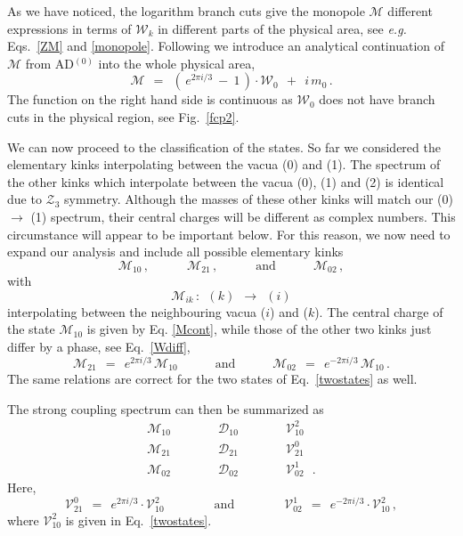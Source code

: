 \documentclass[epsfig,12pt]{article}
\def\beq{\begin{equation}}
\def\eeq{\end{equation}}
\def\beq{\begin{equation}}
\def\eeq{\end{equation}}
\newcommand{\mc}[1]{\mathcal{#1}}
\newcommand{\W}{\mathcal{W}}
\newcommand{\M}{\mathcal{M}}
\newcommand{\D}{\mathcal{D}}
\newcommand{\V}{\mathcal{V}}
\begin{document}
	As we have noticed, the logarithm branch cuts give the monopole $ \M $ different expressions in terms
	of $ \W_k $ in different parts of the physical area, see {\it e.g.} Eqs.~\eqref{ZM} and \eqref{monopole}.
	Following \cite{Bolokhov:2011mp} we introduce an analytical continuation of $ \M $ from AD$^{(0)}$ into
	the whole physical area,
\beq
\label{Mcont}
	\M  ~~=~~  \left(\, e^{2 \pi i / 3} ~-~ 1 \,\right) \cdot \W_0  ~~+~~  i\, m_0\,.
\eeq
	The function on the right hand side is continuous as $ \W_0 $ does not have branch cuts in the physical 
	region, see Fig.~\ref{fcp2}.

	We can now proceed to the classification of the states.
	So far we considered the elementary kinks interpolating between
	the vacua ({\sc \small 0}) and ({\sc \small 1}).
	The spectrum of the other kinks which interpolate between the vacua ({\sc \small 0}), ({\sc \small 1}) and ({\sc \small 2})
	is identical due to $ \mc{Z}_3 $ symmetry.
	Although the masses of these other kinks will match our ({\sc \small 0}) $ \rightarrow $ ({\sc \small 1}) spectrum, 
	their central charges will be different as complex numbers.
	This circumstance will appear to be important below.
	For this reason, we now need to expand our analysis and include all possible elementary kinks
\beq
	\M_{10}\,,   \qquad\quad     \M_{21}\,,     \qquad\quad\text{and}\qquad\quad   \M_{02}\,,
\eeq
	with
\beq
	\M_{ik} \,:  ~~  ({ \scriptstyle k }) ~~\longrightarrow~~ ({ \scriptstyle i })
\eeq
	interpolating between the neighbouring vacua ($ \scriptstyle i $) and ($ \scriptstyle k $).
	The central charge of the state $ \M_{10} $ is given by Eq. \eqref{Mcont}, while those
	of the other two kinks just differ by a phase, see Eq.~\eqref{Wdiff},
\beq
	\M_{21} ~~=~~ e^{2 \pi i / 3}\, \M_{10}  
	\qquad\quad \text{and} \qquad\quad 
	\M_{02} ~~=~~ e^{- 2 \pi i / 3}\, \M_{10}\,.
\eeq
	The same relations are correct for the two states of Eq.~\eqref{twostates} as well.

	The strong coupling spectrum can then be summarized as
\beq
\label{sspectrum}
	\begin{array}{ccc}
		\M_{10} \qquad\quad    &    \D_{10} \qquad\quad    &    \V_{10}^2    \phantom{~~~.}    \\[2mm]
		\M_{21} \qquad\quad    &    \D_{21} \qquad\quad    &    \V_{21}^0    \phantom{~~~.}    \\[2mm]
		\M_{02} \qquad\quad    &    \D_{02} \qquad\quad    &    \V_{02}^1    ~~~. 
	\end{array}
\eeq
	Here, 
\beq
	\V_{21}^0  ~~=~~  e^{2 \pi i / 3} \cdot \V_{10}^2 
	\qquad\qquad  \text{and}  \qquad\qquad
	\V_{02}^1  ~~=~~  e^{- 2 \pi i / 3} \cdot \V_{10}^2 \,,
\eeq
	where $ \V_{10}^2 $ is given in Eq.~\eqref{twostates}.
\end{document}
